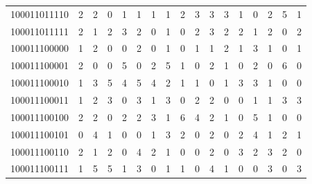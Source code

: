\documentclass[10pt,a4paper]{article}
\begin{document}
\begin{longtable}{ |c|c|c|c|c|c|c|c|c|c|c|c|c|c|c|c|c| }
    100011011110              & 2                            & 2                                & 0                            & 1                              & 1   & 1   & 1   & 2   & 3   & 3   & 3   & 1   & 0   & 2   & 5   & 1   \\
    100011011111              & 2                            & 1                                & 2                            & 3                              & 2   & 0   & 1   & 0   & 2   & 3   & 2   & 2   & 1   & 2   & 0   & 2   \\
    100011100000              & 1                            & 2                                & 0                            & 0                              & 2   & 0   & 1   & 0   & 1   & 1   & 2   & 1   & 3   & 1   & 0   & 1   \\
    100011100001              & 2                            & 0                                & 0                            & 5                              & 0   & 2   & 5   & 1   & 0   & 2   & 1   & 0   & 2   & 0   & 6   & 0   \\
    100011100010              & 1                            & 3                                & 5                            & 4                              & 5   & 4   & 2   & 1   & 1   & 0   & 1   & 3   & 3   & 1   & 0   & 0   \\
    100011100011              & 1                            & 2                                & 3                            & 0                              & 3   & 1   & 3   & 0   & 2   & 2   & 0   & 0   & 1   & 1   & 3   & 3   \\
    100011100100              & 2                            & 2                                & 0                            & 2                              & 2   & 3   & 1   & 6   & 4   & 2   & 1   & 0   & 5   & 1   & 0   & 0   \\
    100011100101              & 0                            & 4                                & 1                            & 0                              & 0   & 1   & 3   & 2   & 0   & 2   & 0   & 2   & 4   & 1   & 2   & 1   \\
    100011100110              & 2                            & 1                                & 2                            & 0                              & 4   & 2   & 1   & 0   & 0   & 2   & 0   & 3   & 2   & 3   & 2   & 0   \\
    100011100111              & 1                            & 5                                & 5                            & 1                              & 3   & 0   & 1   & 1   & 0   & 4   & 1   & 0   & 0   & 3   & 0   & 3   \\

\end{longtable}
\end{document}
